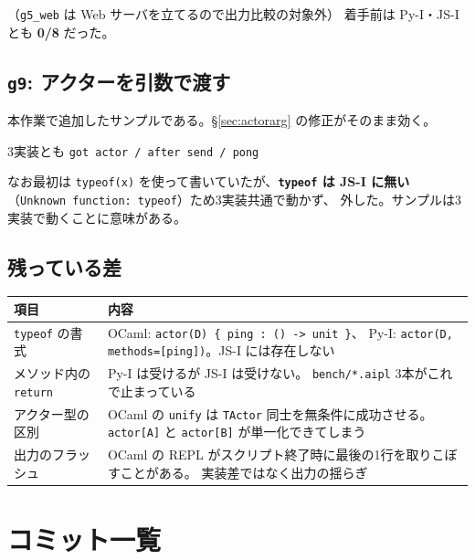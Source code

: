 \documentclass[11pt,a4paper]{ltjsarticle}
\begin{document}
\noindent（\texttt{g5\_web} は Web サーバを立てるので出力比較の対象外）
着手前は Py-I・JS-I とも \textbf{0/8} だった。

\subsection{\texttt{g9}: アクターを引数で渡す}

本作業で追加したサンプルである。\S\ref{sec:actorarg} の修正がそのまま効く。



\begin{center}
\small 3実装とも \texttt{got actor / after send / pong}
\end{center}

なお最初は \texttt{typeof(x)} を使って書いていたが、\textbf{\texttt{typeof} は
JS-I に無い}（\texttt{Unknown function: typeof}）ため3実装共通で動かず、
外した。サンプルは3実装で動くことに意味がある。

\subsection{残っている差}

\begin{center}
\small
\begin{tabular}{@{}lp{9.0cm}@{}}
\toprule
項目 & 内容 \\
\midrule
\texttt{typeof} の書式 &
  OCaml: \verb|actor(D) { ping : () -> unit }|、
  Py-I: \verb|actor(D, methods=[ping])|。JS-I には存在しない \\
メソッド内の \texttt{return} &
  Py-I は受けるが JS-I は受けない。
  \texttt{bench/*.aipl} 3本がこれで止まっている \\
アクター型の区別 &
  OCaml の \texttt{unify} は \texttt{TActor} 同士を無条件に成功させる。
  \texttt{actor[A]} と \texttt{actor[B]} が単一化できてしまう \\
出力のフラッシュ &
  OCaml の REPL がスクリプト終了時に最後の1行を取りこぼすことがある。
  実装差ではなく出力の揺らぎ \\
\bottomrule
\end{tabular}
\end{center}

\section{コミット一覧}
\end{document}
